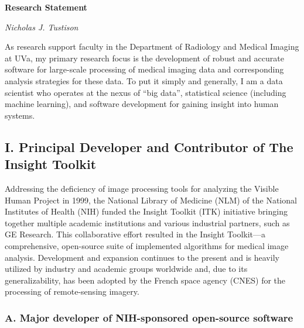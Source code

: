 \documentclass[11pt,]{article}
\title{}
\author{}
\date{}
\begin{document}
\maketitle


\begin{center}
{\Large \bf Research Statement}  

{\em Nicholas J. Tustison}
\end{center}

As research support faculty in the Department of Radiology and Medical
Imaging at UVa, my primary research focus is the development of robust
and accurate software for large-scale processing of medical imaging data
and corresponding analysis strategies for these data. To put it simply
and generally, I am a data scientist who operates at the nexus of ``big
data'', statistical science (including machine learning), and software
development for gaining insight into human systems.

\subsection{I. Principal Developer and Contributor of The Insight
Toolkit}\label{i.-principal-developer-and-contributor-of-the-insight-toolkit}

Addressing the deficiency of image processing tools for analyzing the
Visible Human Project in 1999, the National Library of Medicine (NLM) of
the National Institutes of Health (NIH) funded the Insight Toolkit (ITK)
initiative bringing together multiple academic institutions and various
industrial partners, such as GE Research. This collaborative effort
resulted in the Insight Toolkit---a comprehensive, open-source suite of
implemented algorithms for medical image analysis. Development and
expansion continues to the present and is heavily utilized by industry
and academic groups worldwide and, due to its generalizability, has been
adopted by the French space agency (CNES) for the processing of
remote-sensing imagery.

\subsubsection{A. Major developer of NIH-sponsored open-source
software}\label{a.-major-developer-of-nih-sponsored-open-source-software}
\end{document}
